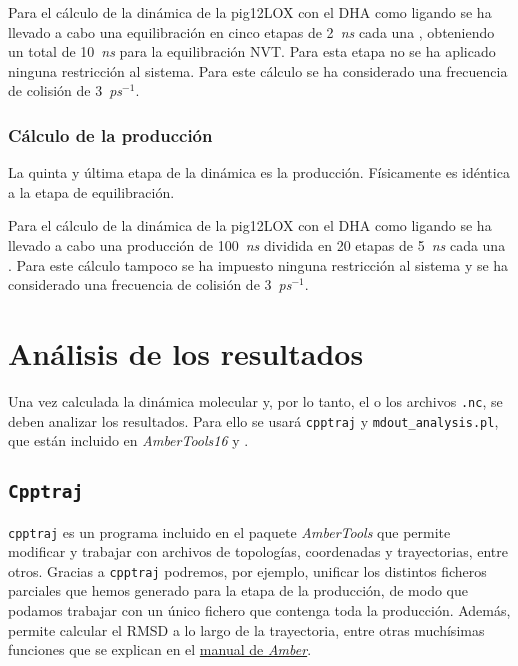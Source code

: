             
            \textsf{Para el cálculo de la dinámica de la pig12LOX con el DHA como ligando se ha llevado a cabo una equilibración en cinco etapas de 2~\textit{ns} cada una , obteniendo un total de 10~\textit{ns} para la equilibración NVT. Para esta etapa no se ha aplicado ninguna restricción al sistema. Para este cálculo se ha considerado una frecuencia de colisión de 3~\textit{ps}$^{-1}$.}
            
        \subsubsection{Cálculo de la producción}\label{sec:prodcalc}
            La quinta y última etapa de la dinámica es la producción. Físicamente es idéntica a la etapa de equilibración. \par
            \textsf{Para el cálculo de la dinámica de la pig12LOX con el DHA como ligando se ha llevado a cabo una producción de 100~\textit{ns} dividida en 20 etapas de 5~\textit{ns} cada una . Para este cálculo tampoco se ha impuesto ninguna restricción al sistema y se ha considerado una frecuencia de colisión de 3~\textit{ps}$^{-1}$.}
            
\section{Análisis de los resultados}
    Una vez calculada la dinámica molecular y, por lo tanto, el o los archivos \texttt{.nc}, se deben analizar los resultados. Para ello se usará \texttt{cpptraj} y \texttt{mdout\_analysis.pl}, que están incluido en \textit{AmberTools16} y .
    
    \subsection{\texttt{Cpptraj}}
        \texttt{cpptraj} es un programa incluido en el paquete \textit{AmberTools} que permite modificar y trabajar con archivos de topologías, coordenadas y trayectorias, entre otros. Gracias a \texttt{cpptraj} podremos, por ejemplo, unificar los distintos ficheros parciales que hemos generado para la etapa de la producción, de modo que podamos trabajar con un único fichero que contenga toda la producción. Además, permite calcular el RMSD a lo largo de la trayectoria, entre otras muchísimas funciones que se explican en el \href{http://ambermd.org/doc12/Amber17.pdf}{manual de \textit{Amber}}.
        
